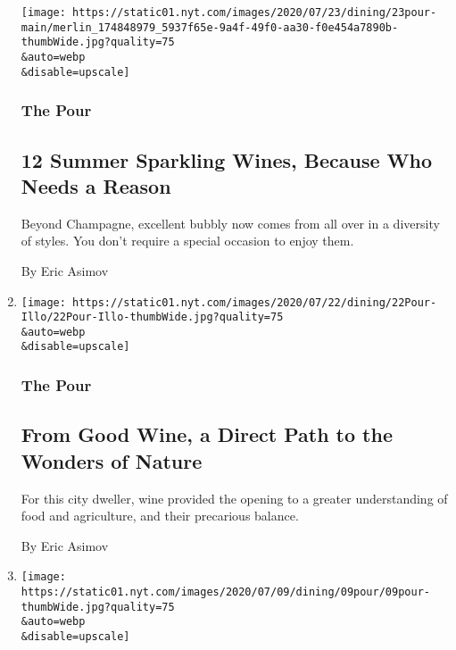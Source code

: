 \begin{enumerate}
  \texttt{[image: https://static01.nyt.com/images/2020/07/23/dining/23pour-main/merlin\_174848979\_5937f65e-9a4f-49f0-aa30-f0e454a7890b-thumbWide.jpg?quality=75\\\&auto=webp\\\&disable=upscale]}

  \hypertarget{the-pour-3}{%
  \subsubsection{The Pour}\label{the-pour-3}}

  \hypertarget{12-summer-sparkling-wines-because-who-needs-a-reason}{%
  \subsection{12 Summer Sparkling Wines, Because Who Needs a
  Reason}\label{12-summer-sparkling-wines-because-who-needs-a-reason}}

  Beyond Champagne, excellent bubbly now comes from all over in a
  diversity of styles. You don't require a special occasion to enjoy
  them.

  By Eric Asimov
\item
  \href{/2020/07/20/dining/drinks/wine-vineyard-viticulture-farming.html}{}

  \texttt{[image: https://static01.nyt.com/images/2020/07/22/dining/22Pour-Illo/22Pour-Illo-thumbWide.jpg?quality=75\\\&auto=webp\\\&disable=upscale]}

  \hypertarget{the-pour-4}{%
  \subsubsection{The Pour}\label{the-pour-4}}

  \hypertarget{from-good-wine-a-direct-path-to-the-wonders-of-nature}{%
  \subsection{From Good Wine, a Direct Path to the Wonders of
  Nature}\label{from-good-wine-a-direct-path-to-the-wonders-of-nature}}

  For this city dweller, wine provided the opening to a greater
  understanding of food and agriculture, and their precarious balance.

  By Eric Asimov
\item
  \href{/2020/07/10/dining/drinks/best-wines-under-20-dollars-pandemic.html}{}

  \texttt{[image: https://static01.nyt.com/images/2020/07/09/dining/09pour/09pour-thumbWide.jpg?quality=75\\\&auto=webp\\\&disable=upscale]}


\end{enumerate}
